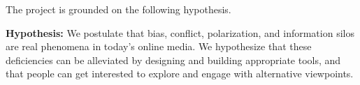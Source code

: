 \documentclass[a4paper,11pt]{article}
\begin{document}
%
The project is grounded on the following hypothesis. 

\medskip
\noindent
\hspace{-3mm}\colorbox{verylightmagenta}{
\begin{minipage}{\textwidth}
{\bf Hypothesis:} 
We postulate that bias, conflict, polarization, and information silos
are real phenomena in today's online media. 
We hypothesize that these deficiencies can be alleviated by designing and building appropriate tools, 
and that people can get interested to explore and engage with alternative viewpoints. 
\end{minipage}}
\end{document}
